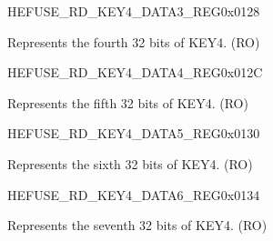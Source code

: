 \begin{register}{H}{EFUSE\_RD\_KEY4\_DATA3\_REG}{0x{}0128}\label{regdesc:EFUSERDKEY4DATA3REG}
%
\regnewline%
\begin{regdesc}\begin{reglist}
\label{fielddesc:EFUSEKEY4DATA3}\item [EFUSE\_KEY4\_DATA3] Represents the fourth 32 bits of KEY4. (RO)
\end{reglist}\end{regdesc}
\end{register}


\begin{register}{H}{EFUSE\_RD\_KEY4\_DATA4\_REG}{0x{}012C}\label{regdesc:EFUSERDKEY4DATA4REG}
%
\regnewline%
\begin{regdesc}\begin{reglist}
\label{fielddesc:EFUSEKEY4DATA4}\item [EFUSE\_KEY4\_DATA4] Represents the fifth 32 bits of KEY4. (RO)
\end{reglist}\end{regdesc}
\end{register}


\begin{register}{H}{EFUSE\_RD\_KEY4\_DATA5\_REG}{0x{}0130}\label{regdesc:EFUSERDKEY4DATA5REG}
%
\regnewline%
\begin{regdesc}\begin{reglist}
\label{fielddesc:EFUSEKEY4DATA5}\item [EFUSE\_KEY4\_DATA5] Represents the sixth 32 bits of KEY4. (RO)
\end{reglist}\end{regdesc}
\end{register}


\begin{register}{H}{EFUSE\_RD\_KEY4\_DATA6\_REG}{0x{}0134}\label{regdesc:EFUSERDKEY4DATA6REG}
%
\regnewline%
\begin{regdesc}\begin{reglist}
\label{fielddesc:EFUSEKEY4DATA6}\item [EFUSE\_KEY4\_DATA6] Represents the seventh 32 bits of KEY4. (RO)
\end{reglist}\end{regdesc}
\end{register}


